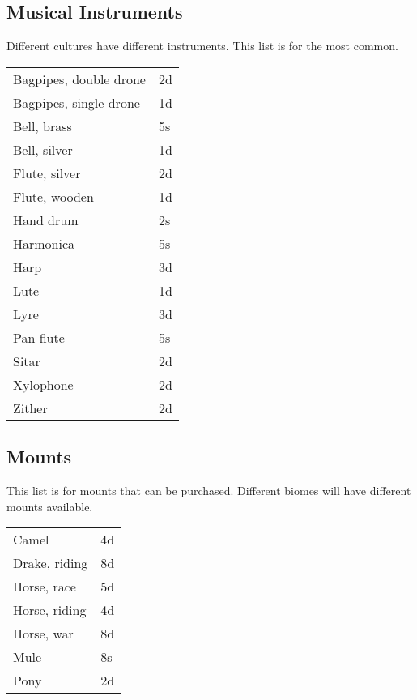\subsection{Musical Instruments}

Different cultures have different instruments. This list is for the most common.

\begin{center}
{
\begin{xtabular}{|l|l|}
Bagpipes, double drone & 2d \\
Bagpipes, single drone & 1d \\
Bell, brass & 5s \\
Bell, silver & 1d \\
Flute, silver & 2d \\
Flute, wooden & 1d \\
Hand drum & 2s \\
Harmonica & 5s \\
Harp & 3d \\
Lute & 1d \\
Lyre & 3d \\
Pan flute & 5s \\
Sitar & 2d \\
Xylophone & 2d \\
Zither & 2d \\
\hline
\end{xtabular}
}
\end{center}

\subsection{Mounts}

This list is for mounts that can be purchased. Different biomes will have different mounts available.

\begin{center}
{
\begin{xtabular}{|l|l|}
Camel & 4d \\
Drake, riding & 8d \\
Horse, race & 5d \\
Horse, riding & 4d \\
Horse, war & 8d \\
Mule & 8s \\
Pony & 2d \\
\hline
\end{xtabular}
}
\end{center}

